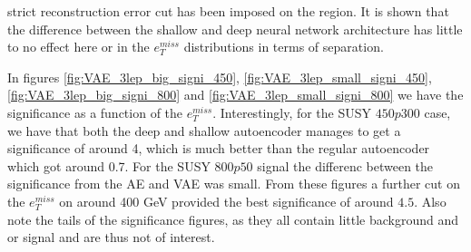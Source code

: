 strict reconstruction error cut has been imposed on the region. It is shown that the 
difference between the shallow and deep neural network architecture has little to no effect 
here or in the $e_T^{miss}$ distributions in terms of separation. \par 
In figures \ref{fig:VAE_3lep_big_signi_450}, \ref{fig:VAE_3lep_small_signi_450}, \ref{fig:VAE_3lep_big_signi_800} and  
\ref{fig:VAE_3lep_small_signi_800} we have the significance as a function of the $e_T^{miss}$.
Interestingly, for the SUSY $450p300$ case, we have that both the deep and shallow 
autoencoder manages to get a significance of around 4, which is much better than the 
regular autoencoder which got around 0.7. For the SUSY $800p50$ signal the differenc between the significance 
from the AE and VAE was small. From these figures a further cut on the 
$e_T^{miss}$ on around 400 GeV provided the best significance of around $4.5$. Also note the tails of 
the significance figures, as they all contain little background and or signal and are 
thus not of interest. 


